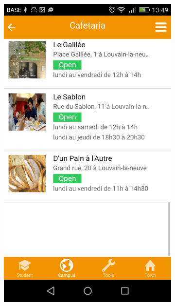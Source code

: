 \documentclass{eplmastersthesis}
\begin{document}
\begin{figure}
\begin{subfigure}[b]{0.3\textwidth}
        \includegraphics[width=\textwidth]{Images/Application_screens/Screenshot_2016-06-06-13-49-08.png}
    \end{subfigure}
    ~ %
    \begin{subfigure}[b]{0.3\textwidth}

\end{subfigure}
\end{figure}
\end{document}
